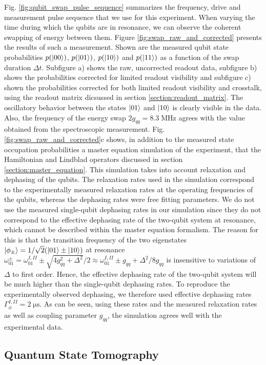 Fig. \ref{fig:qubit_swap_pulse_sequence} summarizes the frequency, drive and measurement pulse sequence that we use for this experiment. When varying the time during which the qubits are in resonance, we can observe the coherent swapping of energy between them. Figure \ref{fig:swap_raw_and_corrected} presents the results of such a measurement. Shown are the measured qubit state probabilities $p(\left| 00 \right>)$, $p(\left| 01 \right>)$, $p(\left| 10 \right>)$ and $p(\left| 11 \right>)$ as a function of the swap duration $\Delta t$. Subfigure a) shows the raw, uncorrected readout data, subfigure b) shows the probabilities corrected for limited readout visibility and subfigure c) shown the probabilities corrected for both limited readout visibility and crosstalk, using the readout matrix dicsussed in section \ref{section:readout_matrix}. The oscillatory behavior between the states $\left| 01 \right>$ and $\left| 10 \right>$ is clearly visible in the data. Also, the frequency of the energy swap $2g_{qq}=8.3\;\mathrm{MHz}$ agrees with the value obtained from the spectroscopic measurement. Fig. \ref{fig:swap_raw_and_corrected}c shows, in addition to the measured state occupation probabilities a master equation simulation of the experiment, that the Hamiltonian and Lindblad operators discussed in section \ref{section:master_equation}. This simulation takes into account relaxation and dephasing of the qubits. The relaxation rates used in the simulation correspond to the experimentally measured relaxation rates at the operating frequencies of the qubits, whereas the dephasing rates were free fitting parameters. We do not use the measured single-qubit dephasing rates in our simulation since they do not correspond to the effective dephasing rate of the two-qubit system at resonance, which cannot be described within the master equation formalism. The reason for this is that the transition frequency of the two eigenstates $\left| \phi_\pm \right>=1/\sqrt{2}(\left| 01 \right>\pm\left| 10 \right>)$ at resonance $\omega_{01}^{\pm}=\omega_{01}^{I,II}\pm\sqrt{4g_{qq}^2+\Delta^2}/2\approx \omega_{01}^{I,II}\pm g_{qq} +\Delta^2/8g_{qq}$ is insensitive to variations of $\Delta$ to first order. Hence, the effective dephasing rate of the two-qubit system will be much higher than the single-qubit dephasing rates. To reproduce the experimentally observed dephasing, we therefore used effective dephasing rates $\Gamma_\phi^{I,II}=2\;\mathrm{\mu s}$. As can be seen, using these rates and the measured relaxation rates as well as coupling parameter $g_{qq}$, the simulation agrees well with the experimental data.


\subsection{Quantum State Tomography}

